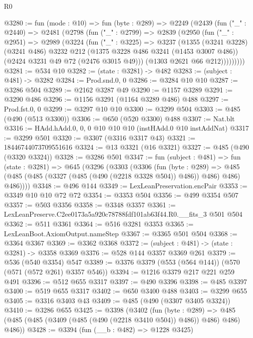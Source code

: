 \begin{lexlean}{R0}
\begin{coremodule}
@3280 := fun (mode : @10) =>
  fun (byte : @289) =>
  @2249
    (@2439
      (fun ("_" : @2440) =>
      @2481
        (@2798
          (fun ("_" : @2799) =>
          @2839
            (@2950
              (fun ("_" : @2951) =>
              @2989
                (@3224
                  (fun ("_" : @3225) =>
                  @3237
                    (@1355
                      (@3241 @3228)
                      (@3241 @486)
                      @3232
                      @212
                      (@1375 @3228 @486 @3241 (@1453 @3007 @486))
                      (@2424 @3231 @49 @72 (@2476 @3015 @49)))
                    (@1303 @2621 @66 @212)))))))))
@3281 := @534 @10
@3282 := (state : @3281) -> @482
@3283 := (subject : @481) -> @3282
@3284 := Prod.snd.{0, 0}
@3286 := @3284 @10 @10
@3287 := @3286 @504
@3289 := @2162 @3287 @49
@3290 := @1157 @3289
@3291 := @3290 @486
@3296 := @1156 @3291 (@1164 @3289 @486) @488
@3297 := Prod.fst.{0, 0}
@3299 := @3297 @10 @10
@3300 := @3299 @504
@3303 := @485 (@490 (@513 @3300))
@3306 := @650 (@520 @3300) @488
@3307 := Nat.blt
@3316 := HAdd.hAdd.{0, 0, 0} @10 @10 @10 (instHAdd.{0} @10 instAddNat)
@3317 := @3299 @501
@3320 := @3307 (@3316 @3317 @43)
@3321 := 18446744073709551616
@3324 := @13 @3321 (@16 @3321)
@3327 := @485 (@490 (@3320 @3324))
@3328 := @3286 @501
@3347 := fun (subject : @481) =>
  fun (state : @3281) =>
  @645
    (@3296
      (@3303
        (@3306
          (fun (byte : @289) =>
          @485 (@485 (@485 (@3327 (@485 (@490 (@2218 @3328 @504)) @486)) @486) @486) @486))))
@3348 := @496 @144
@3349 := LexLeanPreservation.encPair
@3353 := @3349 @10 @10 @72 @72
@3354 := @3353 @504
@3356 := @499 @3354 @507
@3357 := @503 @3356
@3358 := @3348 @3357
@3361 := LexLeanPreserve.C2ee0173a5a920c78788fdf101ab63f44.R0.__fits_3 @501 @504
@3362 := @511 @3361
@3364 := @516 @3281 @3353
@3365 := LexLeanBoot.AxiomOutput.nameStep
@3367 := @3365 @501 @504
@3368 := @3364 @3367
@3369 := @3362 @3368
@3372 := (subject : @481) -> (state : @3281) -> @3358 @3369
@3376 := @528 @144 @3357 @3369 @261
@3379 := @536 (@540 @3354) @547
@3389 := @3376 @3379 (@553 (@564 @144)) (@570 (@571 (@572 @261) @3357 @546))
@3394 := @1216 @3379 @217 @221 @259 @491
@3396 := @512 @655 @3317
@3397 := @490 @3396
@3398 := @485 @3397
@3400 := @519 @655 @3317
@3402 := @650 @3400 @488
@3403 := @3299 @655
@3405 := @3316 @3403 @43
@3409 := @485 (@490 (@3307 @3405 @3324))
@3410 := @3286 @655
@3425 := @3398
    (@3402
      (fun (byte : @289) =>
      @485 (@485 (@485 (@3409 (@485 (@490 (@2218 @3410 @504)) @486)) @486) @486) @486))
@3428 := @3394 (fun (__b : @482) => @1228 @3425)

\end{coremodule}
\end{lexlean}
